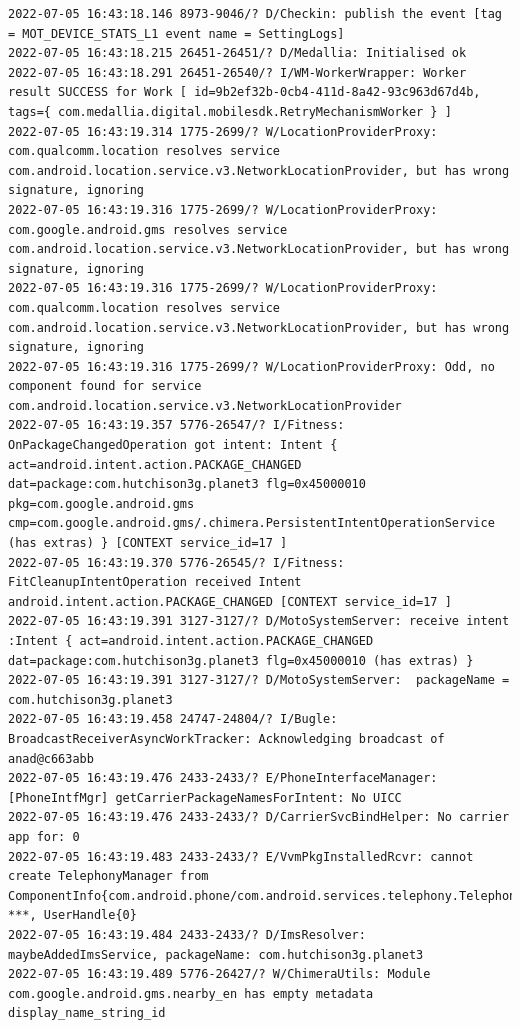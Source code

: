 \documentclass[a4paper,12pt]{book}
\begin{document}
\begin{lstlisting}
2022-07-05 16:43:18.146 8973-9046/? D/Checkin: publish the event [tag = MOT_DEVICE_STATS_L1 event name = SettingLogs]
2022-07-05 16:43:18.215 26451-26451/? D/Medallia: Initialised ok
2022-07-05 16:43:18.291 26451-26540/? I/WM-WorkerWrapper: Worker result SUCCESS for Work [ id=9b2ef32b-0cb4-411d-8a42-93c963d67d4b, tags={ com.medallia.digital.mobilesdk.RetryMechanismWorker } ]
2022-07-05 16:43:19.314 1775-2699/? W/LocationProviderProxy: com.qualcomm.location resolves service com.android.location.service.v3.NetworkLocationProvider, but has wrong signature, ignoring
2022-07-05 16:43:19.316 1775-2699/? W/LocationProviderProxy: com.google.android.gms resolves service com.android.location.service.v3.NetworkLocationProvider, but has wrong signature, ignoring
2022-07-05 16:43:19.316 1775-2699/? W/LocationProviderProxy: com.qualcomm.location resolves service com.android.location.service.v3.NetworkLocationProvider, but has wrong signature, ignoring
2022-07-05 16:43:19.316 1775-2699/? W/LocationProviderProxy: Odd, no component found for service com.android.location.service.v3.NetworkLocationProvider
2022-07-05 16:43:19.357 5776-26547/? I/Fitness: OnPackageChangedOperation got intent: Intent { act=android.intent.action.PACKAGE_CHANGED dat=package:com.hutchison3g.planet3 flg=0x45000010 pkg=com.google.android.gms cmp=com.google.android.gms/.chimera.PersistentIntentOperationService (has extras) } [CONTEXT service_id=17 ]
2022-07-05 16:43:19.370 5776-26545/? I/Fitness: FitCleanupIntentOperation received Intent android.intent.action.PACKAGE_CHANGED [CONTEXT service_id=17 ]
2022-07-05 16:43:19.391 3127-3127/? D/MotoSystemServer: receive intent :Intent { act=android.intent.action.PACKAGE_CHANGED dat=package:com.hutchison3g.planet3 flg=0x45000010 (has extras) }
2022-07-05 16:43:19.391 3127-3127/? D/MotoSystemServer:  packageName = com.hutchison3g.planet3
2022-07-05 16:43:19.458 24747-24804/? I/Bugle: BroadcastReceiverAsyncWorkTracker: Acknowledging broadcast of anad@c663abb
2022-07-05 16:43:19.476 2433-2433/? E/PhoneInterfaceManager: [PhoneIntfMgr] getCarrierPackageNamesForIntent: No UICC
2022-07-05 16:43:19.476 2433-2433/? D/CarrierSvcBindHelper: No carrier app for: 0
2022-07-05 16:43:19.483 2433-2433/? E/VvmPkgInstalledRcvr: cannot create TelephonyManager from ComponentInfo{com.android.phone/com.android.services.telephony.TelephonyConnectionService}, ***, UserHandle{0}
2022-07-05 16:43:19.484 2433-2433/? D/ImsResolver: maybeAddedImsService, packageName: com.hutchison3g.planet3
2022-07-05 16:43:19.489 5776-26427/? W/ChimeraUtils: Module com.google.android.gms.nearby_en has empty metadata display_name_string_id

\end{lstlisting}
\end{document}
